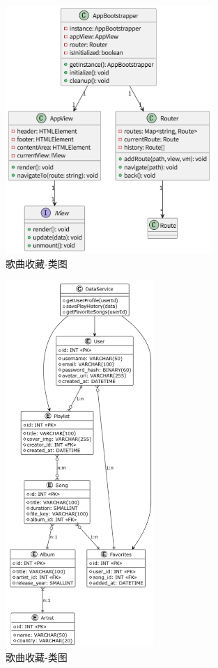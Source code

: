 \documentclass{base}
\begin{document}
\begin{figure}[H]
    \centering
    \includegraphics[width=0.7\textwidth]{images/5-11.png}
    \caption{歌曲收藏-类图}
\end{figure}


\begin{figure}[H]
    \centering
    \includegraphics[width=0.5\textwidth]{images/5-12.png}
    \caption{歌曲收藏-类图}
\end{figure}
\end{document}
